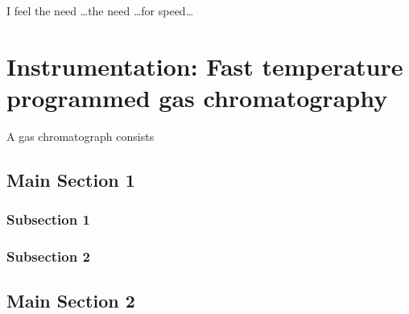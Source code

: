 
\begin{savequote}[45mm]
I feel the need \ldots the need \ldots for speed\ldots
{}
\end{savequote}

\chapter{Instrumentation: Fast temperature programmed gas chromatography} %

\label{Chapter5} %

A gas chromatograph consists

\section{Main Section 1}

\subsection{Subsection 1}

\subsection{Subsection 2}

\section{Main Section 2}
